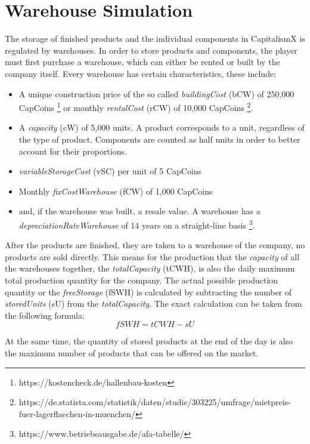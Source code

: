 \section{Warehouse Simulation} \label{warehouse_simulation}

The storage of finished products and the individual components in CapitalismX is regulated by warehouses. In order to store products and components, the player must first purchase a warehouse, which can either be rented or built by the company itself. Every warehouse has certain characteristics, these include:
\begin{itemize}
    \item A unique construction price of the so called \textit{buildingCost} (\gls{bCW}) of 250,000 CapCoins  \footnote{https://kostencheck.de/hallenbau-kosten} or monthly \textit{rentalCost} (\gls{rCW}) of 10,000 CapCoins \footnote{https://de.statista.com/statistik/daten/studie/303225/umfrage/mietpreis-fuer-lagerflaechen-in-muenchen/}.
    \item A \textit{capacity} (\gls{cW}) of 5,000 units. A product corresponds to a unit, regardless of the type of product. Components are counted as half units in order to better account for their proportions. 
    \item \textit{variableStorageCost} (\gls{vSC}) per unit of 5 CapCoins
    \item Monthly \textit{fixCostWarehouse} (\gls{fCW}) of 1,000 CapCoins
    \item and, if the warehouse was built, a resale value. A warehouse has a \textit{depreciationRateWarehouse} of 14 years on a straight-line basis \footnote{https://www.betriebsausgabe.de/afa-tabelle/}.
\end{itemize}

After the products are finished, they are taken to a warehouse of the company, no products are sold directly. This means for the production that the \textit{capacity} of all the warehouses together, the \textit{totalCapacity} (\gls{tCWH}), is also the daily maximum total production quantity for the company. The actual possible production quantity or the \textit{freeStorage} (\gls{fSWH}) is calculated by subtracting the number of \textit{storedUnits} (\gls{sU}) from the \textit{totalCapacity}. The exact calculation can be taken from the following formula: 
\begin{equation}
    fSWH = tCWH - sU
\end{equation}

At the same time, the quantity of stored products at the end of the day is also the maximum number of products that can be offered on the market. 

